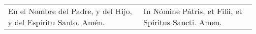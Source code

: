 \documentclass[../devocionario.tex]{subfiles}
\begin{document}
    \begin{longtable} { p{} p{} }
        En el Nombre del Padre, y del Hijo, y del Espíritu Santo. Amén.
        
        &
        
        In Nómine Pátris, et Filii, et Spíritus Sancti. Amen.
    \end{longtable}
\end{document}
